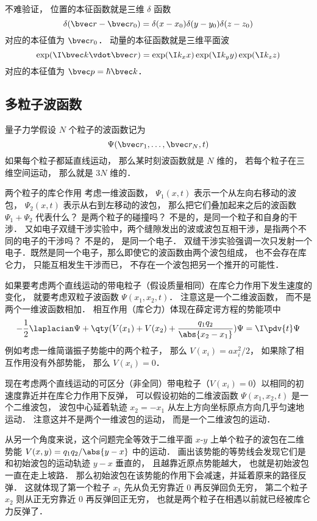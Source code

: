不难验证， 位置的本征函数就是三维 $\delta$ 函数
\begin{equation}
\delta(\bvec r - \bvec r_0) = \delta(x - x_0) \delta(y - y_0) \delta(z - z_0)
\end{equation}
对应的本征值为 $\bvec r_0$． 动量的本征函数就是三维平面波
\begin{equation}
\exp(\I \bvec k \vdot \bvec r) = \exp(\I k_x x) \exp(\I k_y y) \exp(\I k_z z)
\end{equation}
对应的本征值为 $\bvec p = \hbar\bvec k$．

\subsection{多粒子波函数}

量子力学假设 $N$ 个粒子的波函数记为
\begin{equation}
\Psi(\bvec r_1, \dots, \bvec r_N, t)
\end{equation}
如果每个粒子都延直线运动， 那么某时刻波函数就是 $N$ 维的， 若每个粒子在三维空间运动， 那么就是 $3N$ 维的．

\begin{example}{两个粒子的库仑作用}
考虑一维波函数， $\Psi_1(x,t)$ 表示一个从左向右移动的波包， $\Psi_2(x,t)$ 表示从右到左移动的波包， 那么把它们叠加起来之后的波函数 $\Psi_1 + \Psi_2$ 代表什么？ 是两个粒子的碰撞吗？ 不是的，是同一个粒子和自身的干涉． 又如电子双缝干涉实验中，两个缝隙发出的波或波包互相干涉，是指两个不同的电子的干涉吗？ 不是的， 是同一个电子． 双缝干涉实验强调一次只发射一个电子．既然是同一个电子，那么即使它的波函数由两个波包组成， 也不会存在库仑力， 只能互相发生干涉而已， 不存在一个波包把另一个推开的可能性．

如果要考虑两个直线运动的带电粒子（假设质量相同）在库仑力作用下发生速度的变化， 就要考虑双粒子波函数 $\Psi(x_1, x_2, t)$． 注意这是一个二维波函数， 而不是两个一维波函数相加． 相互作用（库仑力）体现在薛定谔方程的势能项中
\begin{equation}
-\frac{1}{2}\laplacian \Psi + \qty(V(x_1) + V(x_2) + \frac{q_1 q_2}{\abs{x_2 - x_1}}) \Psi = \I \pdv{t}\Psi
\end{equation}
例如考虑一维简谐振子势能中的两个粒子， 那么 $V(x_i) = ax_i^2/2$， 如果除了相互作用没有外部势能， 那么 $V(x_i) = 0$．

现在考虑两个直线运动的可区分（非全同）带电粒子（$V(x_i) = 0$）以相同的初速度靠近并在库仑力作用下反弹， 可以假设初始的二维波函数 $\Psi(x_1, x_2, t)$ 是一个二维波包， 波包中心延着轨迹 $x_2 = -x_1$ 从左上方向坐标原点方向几乎匀速地运动． 注意这并不是两个一维波包的运动， 而是一个二维波包的运动．

从另一个角度来说，这个问题完全等效于二维平面 $x$-$y$ 上单个粒子的波包在二维势能 $V(x,y) = q_1q_2/\abs{y-x}$ 中的运动． 画出该势能的等势线会发现它们是和初始波包的运动轨迹 $y-x$ 垂直的， 且越靠近原点势能越大， 也就是初始波包一直在走上坡路． 那么初始波包在该势能的作用下会减速，并延着原来的路径反弹． 这就体现了第一个粒子 $x_1$ 先从负无穷靠近 $0$ 再反弹回负无穷， 第二个粒子 $x_2$ 则从正无穷靠近 $0$ 再反弹回正无穷， 也就是两个粒子在相遇以前就已经被库仑力反弹了．
\end{example}
